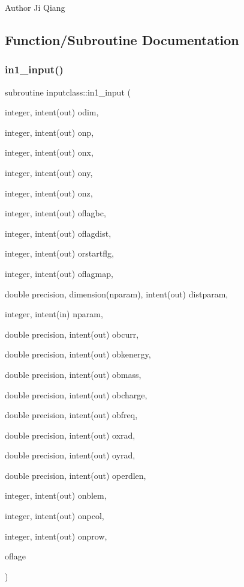 \begin{DoxyAuthor}{Author}
Ji Qiang 
\end{DoxyAuthor}


\subsection{Function/\+Subroutine Documentation}
\mbox{\label{namespaceinputclass_a907319f6e5d34930fbc63f5af426e9bd}} 
\subsubsection{\texorpdfstring{in1\_input()}{in1\_input()}}
{\footnotesize\ttfamily subroutine inputclass\+::in1\+\_\+input (\begin{DoxyParamCaption}\item[{integer, intent(out)}]{odim,  }\item[{integer, intent(out)}]{onp,  }\item[{integer, intent(out)}]{onx,  }\item[{integer, intent(out)}]{ony,  }\item[{integer, intent(out)}]{onz,  }\item[{integer, intent(out)}]{oflagbc,  }\item[{integer, intent(out)}]{oflagdist,  }\item[{integer, intent(out)}]{orstartflg,  }\item[{integer, intent(out)}]{oflagmap,  }\item[{double precision, dimension(nparam), intent(out)}]{distparam,  }\item[{integer, intent(in)}]{nparam,  }\item[{double precision, intent(out)}]{obcurr,  }\item[{double precision, intent(out)}]{obkenergy,  }\item[{double precision, intent(out)}]{obmass,  }\item[{double precision, intent(out)}]{obcharge,  }\item[{double precision, intent(out)}]{obfreq,  }\item[{double precision, intent(out)}]{oxrad,  }\item[{double precision, intent(out)}]{oyrad,  }\item[{double precision, intent(out)}]{operdlen,  }\item[{integer, intent(out)}]{onblem,  }\item[{integer, intent(out)}]{onpcol,  }\item[{integer, intent(out)}]{onprow,  }\item[{}]{oflage }\end{DoxyParamCaption})}



